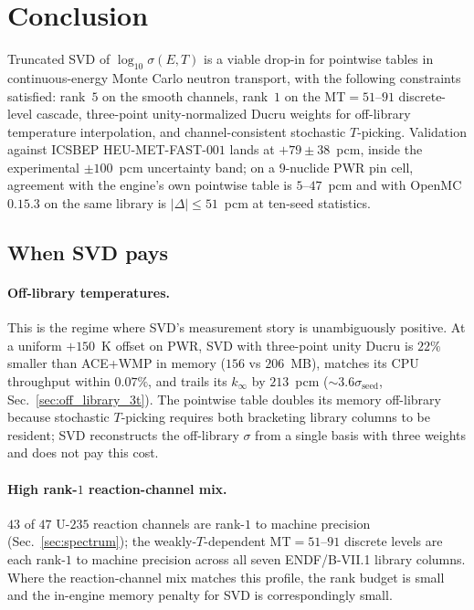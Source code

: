 \section{Conclusion}

Truncated SVD of $\log_{10}\sigma(E,T)$ is a viable
drop-in for pointwise tables in continuous-energy Monte
Carlo neutron transport, with the following constraints
satisfied: rank~$5$ on the smooth channels, rank~$1$ on
the MT$=51$--$91$ discrete-level cascade,
three-point unity-normalized Ducru weights for off-library
temperature interpolation, and channel-consistent
stochastic $T$-picking. Validation against
ICSBEP HEU-MET-FAST-$001$ lands at $+79 \pm 38$~pcm,
inside the experimental $\pm100$~pcm uncertainty band;
on a $9$-nuclide PWR pin cell, agreement with the engine's
own pointwise table is $5$--$47$~pcm and with OpenMC
$0.15.3$ on the same library is $|\Delta| \le 51$~pcm at
ten-seed statistics.

\subsection{When SVD pays}
\label{sec:when}

\paragraph{Off-library temperatures.}
This is the regime where SVD's measurement story is
unambiguously positive. At a uniform $+150$~K offset on
PWR, SVD with three-point unity Ducru is $22\%$ smaller
than ACE+WMP in memory ($156$ vs $206$~MB), matches
its CPU throughput within $0.07\%$, and trails its
$k_\infty$ by $213$~pcm
($\sim\!3.6\sigma_\text{seed}$, Sec.~\ref{sec:off_library_3t}).
The pointwise table doubles its memory off-library because
stochastic $T$-picking requires both bracketing library
columns to be resident; SVD reconstructs the off-library
$\sigma$ from a single basis with three weights and does
not pay this cost.

\paragraph{High rank-$1$ reaction-channel mix.}
$43$ of $47$ U-$235$ reaction channels are rank-$1$ to
machine precision (Sec.~\ref{sec:spectrum}); the
weakly-$T$-dependent MT$=51$--$91$ discrete levels are
each rank-$1$ to machine precision across all seven
ENDF/B-VII.1 library columns. Where the reaction-channel
mix matches this profile, the rank budget is small and the
in-engine memory penalty for SVD is correspondingly
small.

